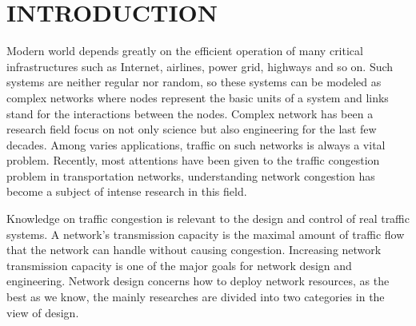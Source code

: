 \documentclass[onecolumn,preprintnumbers,amsmath,amssymb]{revtex4}
\begin{document}
\section*{INTRODUCTION\protect}
Modern world depends greatly on the efficient operation of many critical infrastructures such as Internet, airlines, power grid, highways and so on\cite{TCIC}.
Such systems are neither regular nor random, so these systems can be modeled as complex networks where nodes represent the basic units of a system and links stand for the interactions between the nodes\cite{TFWN}. 
Complex network has been a research field focus on not only science but also engineering for the last few decades\cite{PSV, AEM, KIG, BTS, LZYC, HHM, RAA, SND, MEJ, SBV}.
Among varies applications, traffic on such networks is always a vital problem. 
Recently, most attentions have been given to the traffic congestion problem in transportation networks, understanding network congestion has become a subject of intense research in this field.

Knowledge on traffic congestion is relevant to the design and control of real traffic systems. 
A network’s transmission capacity is the maximal amount of traffic flow that the network can handle without causing congestion\cite{TORS}. 
Increasing network transmission capacity is one of the major goals for network design and engineering.
Network design concerns how  to deploy network resources, as the best as we know, the mainly researches are divided into two categories in the view of design.
\end{document}
